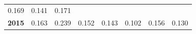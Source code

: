 \documentclass[]{article}
\begin{document}
\begin{longtable}[]{@{}rrrrrrrr@{}}
\begin{minipage}[t]{0.09\columnwidth}
0.169\strut
\end{minipage} & \begin{minipage}[t]{0.08\columnwidth}\raggedleft\strut
0.141\strut
\end{minipage} & \begin{minipage}[t]{0.10\columnwidth}\raggedleft\strut
0.171\strut
\end{minipage}\tabularnewline
\begin{minipage}[t]{0.08\columnwidth}\raggedleft\strut
\textbf{2015}\strut
\end{minipage} & \begin{minipage}[t]{0.10\columnwidth}\raggedleft\strut
0.163\strut
\end{minipage} & \begin{minipage}[t]{0.11\columnwidth}\raggedleft\strut
0.239\strut
\end{minipage} & \begin{minipage}[t]{0.08\columnwidth}\raggedleft\strut
0.152\strut
\end{minipage} & \begin{minipage}[t]{0.14\columnwidth}\raggedleft\strut
0.143\strut
\end{minipage} & \begin{minipage}[t]{0.09\columnwidth}\raggedleft\strut
0.102\strut
\end{minipage} & \begin{minipage}[t]{0.08\columnwidth}\raggedleft\strut
0.156\strut
\end{minipage} & \begin{minipage}[t]{0.10\columnwidth}\raggedleft\strut
0.130\strut
\end{minipage}\tabularnewline
\bottomrule
\end{longtable}

\setlength{\parindent}{0in} \setlength{\leftskip}{0in}
\setlength{\parskip}{0pt} \noindent
\newpage
\end{document}
